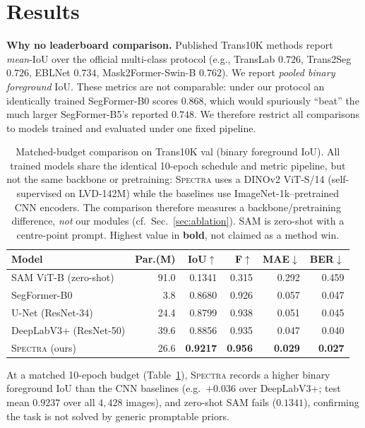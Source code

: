 \documentclass{article}
\newcommand{\spectra}{\textsc{Spectra}}
\newcommand{\dinov}{DINOv2}
\newcommand{\iou}{IoU}
\newcommand{\best}[1]{\textbf{#1}}
\begin{document}
\section{Results}
\label{sec:results}
\textbf{Why no leaderboard comparison.} Published Trans10K methods report
\emph{mean}-\iou{} over the official multi-class protocol (e.g., TransLab
$0.726$, Trans2Seg $0.726$, EBLNet $0.734$, Mask2Former-Swin-B $0.762$). We
report \emph{pooled binary foreground} \iou. These metrics are not comparable:
under our protocol an identically trained SegFormer-B0 scores $0.868$, which
would spuriously ``beat'' the much larger SegFormer-B5's reported $0.748$. We
therefore restrict all comparisons to models trained and evaluated under one
fixed pipeline.

\begin{table}[t]
\centering
\caption{Matched-budget comparison on Trans10K val (binary foreground
\iou). All trained models share the identical 10-epoch schedule and metric
pipeline, but not the same backbone or pretraining: \spectra{} uses a
\dinov{} ViT-S/14 (self-supervised on LVD-142M) while the baselines use
ImageNet-1k--pretrained CNN encoders. The comparison therefore measures a
backbone/pretraining difference, \emph{not} our modules (cf.\ Sec.~\ref{sec:ablation}).
SAM is zero-shot with a centre-point prompt. Highest value in \textbf{bold}, not
claimed as a method win.}
\label{tab:main}
\setlength{\tabcolsep}{4.5pt}
\begin{tabular}{lrrrrr}
\toprule
Model & Par.(M) & \iou$\uparrow$ & F$\uparrow$ & MAE$\downarrow$ & BER$\downarrow$ \\
\midrule
SAM ViT-B (zero-shot) & 91.0 & 0.1341 & 0.315 & 0.292 & 0.459 \\
SegFormer-B0 & 3.8 & 0.8680 & 0.926 & 0.057 & 0.047 \\
U-Net (ResNet-34) & 24.4 & 0.8799 & 0.938 & 0.051 & 0.045 \\
DeepLabV3+ (ResNet-50) & 39.6 & 0.8856 & 0.935 & 0.047 & 0.040 \\
\spectra{} (ours) & 26.6 & \best{0.9217} & \best{0.956} & \best{0.029} & \best{0.027} \\
\bottomrule
\end{tabular}
\end{table}

At a matched 10-epoch budget (Table~\ref{tab:main}), \spectra{} records a higher
binary foreground \iou{} than the CNN baselines (e.g.\ $+0.036$ over DeepLabV3+;
test mean $0.9237$ over all $4{,}428$ images), and zero-shot SAM fails
($0.1341$), confirming the task is not solved by generic promptable priors.
\end{document}
